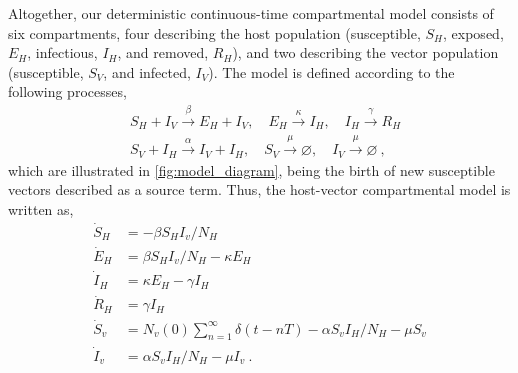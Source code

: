 Altogether, our deterministic continuous-time compartmental model consists
of six compartments, four describing the host population (susceptible, $S_H$,
exposed, $E_H$, infectious, $I_H$, and removed, $R_H$), and two describing the
vector population (susceptible, $S_V$, and infected, $I_V$). The model is
defined according to the following processes,
\begin{equation}\label{eq:scheme_infection}
    \begin{aligned}
         & S_H+I_V \stackrel{\beta}{\rightarrow} E_H + I_V, \quad
        E_H \stackrel{\kappa}{\rightarrow} I_H, \quad
        I_H  \stackrel{\gamma}{\rightarrow} R_H                      \\
         & S_V+I_H \stackrel{\alpha}{\rightarrow} I_V+I_H, \quad S_V
        \stackrel{\mu}{\rightarrow} \varnothing, \quad I_V
        \stackrel{\mu}{\rightarrow}
        \varnothing
        \ ,
    \end{aligned}
\end{equation}
which are illustrated in \cref{fig:model_diagram}, being the birth of new
susceptible vectors described as a source term.
Thus, the host-vector compartmental model is written as,
\begin{equation}\label{eq:SEIR_v}
    \begin{aligned}
        \dot{S}_H & =-\beta S_H I_v / N_H                                   \\
        \dot{E}_H & =\beta S_H I_v / N_H - \kappa E_H                       \\
        \dot{I}_H & =\kappa E_H - \gamma I_H                                \\
        \dot{R}_H & =\gamma I_H                                             \\
        \dot{S}_v & = N_v(0)\sum_{n=1}^{\infty}\delta(t-nT) -\alpha S_v I_H
        / N_H - \mu S_v                                                     \\
        \dot{I}_v & =\alpha S_v I_H / N_H - \mu I_v \ .
    \end{aligned}
\end{equation}

